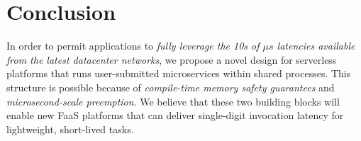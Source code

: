 \section{Conclusion}
\label{sec:concl}

In order to permit applications to \textit{fully leverage the 10s of $\mu{}s$
latencies available from the latest datacenter networks}, we propose a novel design
for serverless platforms that runs user-submitted microservices within shared
processes.  This structure is possible because of
\textit{compile-time memory safety guarantees} and \textit{microsecond-scale
preemption}.  We believe that these
two building blocks will enable new FaaS platforms that can deliver single-digit
invocation latency for lightweight, short-lived tasks.
